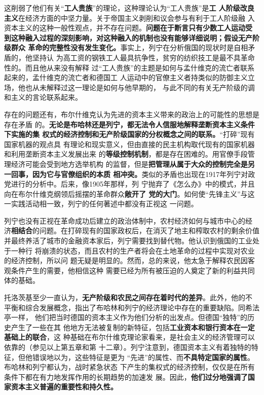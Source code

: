 这削弱了他们有关“\textbf{工人贵族}”的理论，这种理论认为“工人贵族”是\textbf{工
  人阶级改良主义}在经济方面的中坚力量。关于帝国主义剥削和议会参与有利于工人阶级融
入资本主义的这种一般性观点，并不存在问题。\textbf{问题在于断言只有少数工人运动受
  到这种融入过程的深刻影响，对这种融入的机制也没有能够详细说明；假设无产阶级群众
  革命的完整性没有发生变化。}事实上，列宁在分析俄国的现状时是自相矛盾的，他坚持认
为高工资的钢铁工人最具抗争性，贫穷的纺织技工是最不具革命性的。而且他从来没有解释
过“工人贵族”的主题是如何与孟什维克的流亡者联系起来的，孟什维克的流亡者和德国工
人运动中的官僚主义者持类似的防御主义立场，他也从未解释过这一理论是如何与他早期的，
与此不同的有关无产阶级的调和主义的言论联系起来。


存在的问题还有，布尔什维克认为先进的资本主义带来的政治上的可能性的思想是存在矛盾
的。\textbf{无论是布哈林还是列宁，都无法令人信服地解释垄断资本主义条件下实施的集
  权式的经济控制和无产阶级国家的分权概念之间的联系。}“打碎”现有国家机器的观点具
有理论和现实意义，但由直接的民主机构取代现有的国家机器和利用垄断资本主义发展出来
的\textbf{等级控制机制}，都是存在困难的。用官僚手段管理经济可能会受到地方选举机构
的监督，但是\textbf{把管理从属于大众的控制完全是另一回事，因为它与官僚组织的本质
  相冲突。}类似的矛盾也出现在1917年列宁对政党进行的分析中。后来，像1905年那样，列
宁抛弃了《怎么办》中的模式，并且向在布尔什维克纲领后摇摆的革命群众\textbf{敞开了
  党的大门}。如何使“先锋主义”与这一实践活动相一致，列宁的任何著述中都没有正视这
一问题。

列宁也没有正视在革命成功后建立的政治体制中，农村经济如何与城市中心的经
济\textbf{相结合}的问题。在打碎现有的国家政权后，在消灭了地主和榨取农村的剩余价值
并最终养活了城市的金融资本家后，列宁需要找到替代物。他认识到俄国的工业处于一种行
将崩溃的状态，而且农村的生产者将会在土地革命的过程中实现对农业的经济控制，所以问
题无疑是明显的。然而，总的来说，他太急于解释农民因客观条件产生的需要，他相信这种
需要已经为所有被压迫的人奠定了新的利益共同体的基础。

托洛茨基至少一直认为，\textbf{无产阶级和农民之间存在着时代的差异}。此外，他的不
平衡和综合发展概念，指出了布哈林和列宁的经济理论中存在的重要缺陷。同希法亭一样，
他们把当时德国的资本主义作为他们分析的出发点。但德国“独特”的历史产生了一些在其
他地方无法被复制的新特征，包括\textbf{工业资本和银行资本在一定基础上的联合}，这
种基础在布尔什维克理论家看来，是社会主义的经济管理可以依靠的（参见以上第五章和第
十二章）。列宁注意到，德国资本主义有着独特的特征，但他错误地以为，这些特征是更为
“先进”的属性、而\textbf{不具特定国家的属性}。布哈林和列宁都认为，战时紧急状态
下产生的集权式的经济控制，仅仅是在所有条件下都在有力地发挥作用的长期趋势的加速发
展。因此，\textbf{他们过分地强调了国家资本主义普遍的重要性和持久性。}

